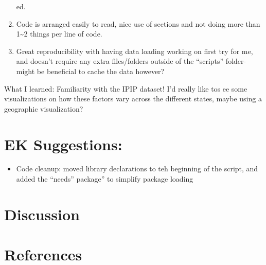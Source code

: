 \documentclass[
  english,
  man]{apa6}
\providecommand{\tightlist}{%
  \setlength{\itemsep}{0pt}\setlength{\parskip}{0pt}}
\begin{document}
\begin{enumerate}
ed.
\item
  Code is arranged easily to read, nice use of sections and not doing more than 1\textasciitilde2 things per line of code.
\item
  Great reproducibility with having data loading working on first try for me, and doesn't require any extra files/folders outside of the ``scripts'' folder- might be beneficial to cache the data however?
\end{enumerate}

What I learned: Familiarity with the IPIP dataset! I'd really like tos ee some visualizations on how these factors vary across the different states, maybe using a geographic visualization?

\hypertarget{ek-suggestions}{%
\section{EK Suggestions:}\label{ek-suggestions}}

\begin{itemize}
\tightlist
\item
  Code cleanup: moved library declarations to teh beginning of the script, and added the ``needs'' package'' to simplify package loading
\end{itemize}

\hypertarget{discussion}{%
\section{Discussion}\label{discussion}}

\newpage

\hypertarget{references}{%
\section{References}\label{references}}

\begingroup
\setlength{\parindent}{-0.5in}
\setlength{\leftskip}{0.5in}
\end{document}
